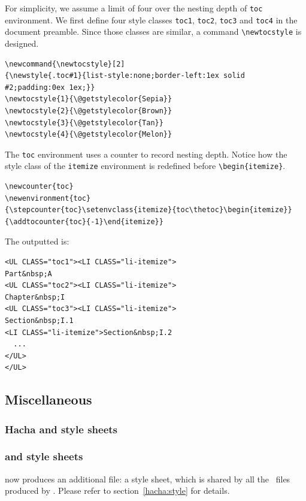 For simplicity, we assume a limit of four over the nesting depth of
\texttt{toc} environment.
We first define four style classes \texttt{toc1}, \texttt{toc2},
\texttt{toc3} and \texttt{toc4} in the document preamble.
Since those classes are similar, a command \verb+\newtocstyle+ is
designed.
\begin{verbatim}
\newcommand{\newtocstyle}[2]
{\newstyle{.toc#1}{list-style:none;border-left:1ex solid #2;padding:0ex 1ex;}}
\newtocstyle{1}{\@getstylecolor{Sepia}}
\newtocstyle{2}{\@getstylecolor{Brown}}
\newtocstyle{3}{\@getstylecolor{Tan}}
\newtocstyle{4}{\@getstylecolor{Melon}}
\end{verbatim}
The \texttt{toc} environment uses a counter to record nesting depth.
Notice how the style class of the \texttt{itemize} environment is
redefined before \verb+\begin{itemize}+.
\begin{verbatim}
\newcounter{toc}
\newenvironment{toc}
{\stepcounter{toc}\setenvclass{itemize}{toc\thetoc}\begin{itemize}}
{\addtocounter{toc}{-1}\end{itemize}}
\end{verbatim}
The outputted {\html} is:
\begin{verbatim}
<UL CLASS="toc1"><LI CLASS="li-itemize">
Part&nbsp;A
<UL CLASS="toc2"><LI CLASS="li-itemize">
Chapter&nbsp;I
<UL CLASS="toc3"><LI CLASS="li-itemize">
Section&nbsp;I.1
<LI CLASS="li-itemize">Section&nbsp;I.2
  ...
</UL>
</UL>
\end{verbatim}

\subsection{Miscellaneous}
\ifpdf
\subsubsection{Hacha and style sheets}
\else
\subsubsection{\hacha{} and style sheets}
\fi
\hacha{} now produces an additional file: a style sheet, which is
shared by all the~{\html} files produced by \hacha.
Please refer to section~\ref{hacha:style} for details.

